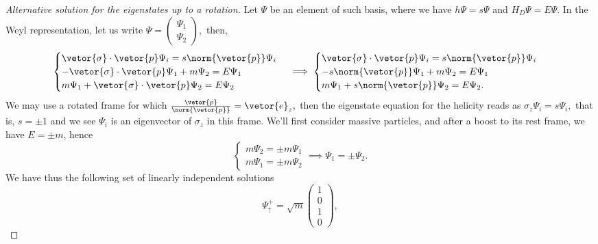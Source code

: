 \begin{proof}[Alternative solution for the eigenstates up to a rotation]
   Let \(\Psi\) be an element of such basis, where we have \(h \Psi = s \Psi\) and \(H_D \Psi = E \Psi.\) In the Weyl representation, let us write \(\Psi = \left(\begin{smallmatrix}
         \Psi_1\\
         \Psi_2
   \end{smallmatrix}\right),\) then,
   \begin{equation*}
      \begin{cases}
         \vetor{\sigma}\cdot \vetor{p} \Psi_i = s \norm{\vetor{p}} \Psi_i\\
         -\vetor{\sigma} \cdot \vetor{p} \Psi_1 + m \Psi_2 = E \Psi_1\\
         m \Psi_1 + \vetor{\sigma} \cdot \vetor{p} \Psi_2 = E \Psi_2
      \end{cases}
      \implies
      \begin{cases}
         \vetor{\sigma}\cdot \vetor{p} \Psi_i = s \norm{\vetor{p}} \Psi_i\\
         -s \norm{\vetor{p}} \Psi_1 + m \Psi_2 = E \Psi_1\\
         m \Psi_1 + s \norm{\vetor{p}} \Psi_2 = E \Psi_2.
      \end{cases}
   \end{equation*}
   We may use a rotated frame for which \(\frac{\vetor{p}}{\norm{\vetor{p}}} = \vetor{e}_z,\) then the eigenstate equation for the helicity reads as \(\sigma_z \Psi_i = s \Psi_i,\) that is, \(s = \pm 1\) and we see \(\Psi_i\) is an eigenvector of \(\sigma_z\) in this frame. We'll first consider massive particles, and after a boost to its rest frame, we have \(E = \pm m\), hence
   \begin{equation*}
      \begin{cases}
         m \Psi_2 = \pm m \Psi_1\\
         m \Psi_1 = \pm m \Psi_2
      \end{cases} \implies \Psi_1 = \pm \Psi_2.
   \end{equation*}
   We have thus the following set of linearly independent solutions
   \begin{equation*}
      \Psi^+_\uparrow = \sqrt{m} \begin{pmatrix}
         1 \\ 0\\1 \\ 0
      \end{pmatrix},

\end{equation*}
\end{proof}
